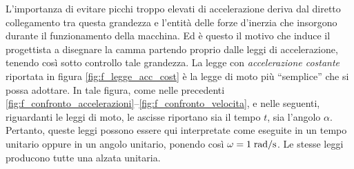 \noindent L'importanza di evitare picchi troppo elevati di accelerazione
deriva dal diretto collegamento tra questa grandezza
e l'entit\`a delle forze d'inerzia che insorgono durante il funzionamento della macchina.
Ed \`e questo il motivo che induce il progettista a disegnare la camma partendo
proprio dalle leggi di accelerazione, tenendo cos\`i sotto controllo
tale grandezza.
La legge con {\em accelerazione costante} riportata in
figura \ref{fig:f_legge_acc_cost} \`e la legge di moto pi\`u ``semplice''
che si possa adottare.
In tale figura, come nelle precedenti 
 \ref{fig:f_confronto_accelerazioni}--\ref{fig:f_confronto_velocita},
e nelle seguenti, riguardanti le leggi di moto, le ascisse riportano
sia il tempo $t$, sia l'angolo $\alpha$. Pertanto, queste leggi
possono essere qui interpretate come eseguite in un tempo unitario oppure
in un angolo unitario, ponendo cos\`i $\omega=1\; {\rm rad}/{\rm s}$. Le stesse leggi producono tutte una alzata unitaria.
